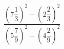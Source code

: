 \begin{ex}[type=calculate]
	\begin{condition}
		\( \dfrac{\left( 7\dfrac{1}{3} \right)^2-\left( 2\dfrac{2}{3} \right)^2}{\left( 5\dfrac{7}{9} \right)^2-\left( 4\dfrac{2}{9} \right)^2} \)
	\end{condition}
\end{ex}